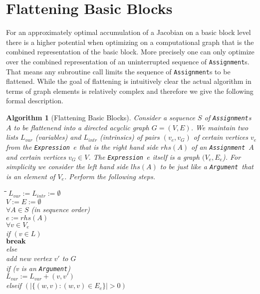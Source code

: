 \documentclass{book}
\newcommand{\Assignment}{{\tt Assignment}}
\newcommand{\Expression}{{\tt Expression}}
\newcommand{\Argument}{{\tt Argument}}
\newtheorem{Alg}{Algorithm}
\begin{document}
\section{Flattening Basic Blocks}
\label{sec:Flattening_Basic_Blocks}
For an approximately optimal accumulation of a Jacobian 
on a basic block level there is a higher potential when 
optimizing on a computational graph that is the combined 
representation of the basic block. More precisely one can only
optimize over the combined representation of an uninterrupted 
sequence of {\Assignment}s. That means any subroutine 
call limits the sequence of {\Assignment}s to be flattened.
While the goal of flattening is intuitively clear the actual 
algorithm in terms of graph elements is relatively complex and 
therefore we give the following formal description.
\begin{Alg}[Flattening Basic Blocks]
Consider a sequence $S$ of {\Assignment}s $A$ to be
flattenend into a 
  directed acyclic graph $G=(V,E)$. We maintain two lists $L_{var}$ 
(variables) 
and $L_{intr}$ (intrinsics)   
of pairs $(v_e,v_G)$ of certain vertices $v_e$ from the 
\Expression\ $e$ that is the right hand side $rhs(A)$ of an \Assignment\ $A$
and certain vertices $v_G \in V$. The \Expression\ $e$ itself is a graph 
$(V_e,E_e$). For simplicity we consider the left hand side $lhs(A)$ to be 
just like a \Argument\ that is an element of $V_e$.
Perform the following steps.
\begin{tabbing}
\hspace*{3ex}\=\hspace*{3ex}\=\hspace*{3ex}\=\hspace*{3ex}\=\hspace*{-13ex}
$L_{var}:=L_{intr}:=\emptyset$ \\
$V:=E:=\emptyset$ \\
$\forall  A \in S $ (in sequence order) \\
\> $e:=rhs(A)$ \\
\> $\forall v\in V_e$  \\
\>\> if $(v\in L)$  \\
\>\>\> ${\bf break}$\\
\>\> else\\
\>\>\> add new vertex $v'$ to $G$ \\ 
\>\>\> if (v is an \Argument)\\
\>\>\>\> $L_{var}:=L_{var}+(v,v')$\\
\>\>\> elseif $(|\{(w,v):(w,v)\in E_e\}|>0)$\\

\end{tabbing}
\end{Alg}
\end{document}
